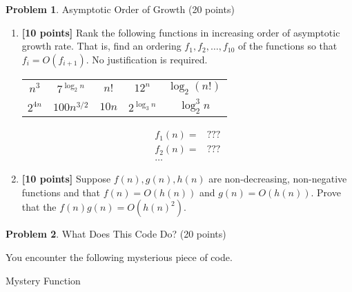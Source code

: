 \documentclass[11pt]{article}
\theoremstyle{definition}
\theoremstyle{theorem}
\newtheorem{prob}{Problem}
\newcommand{\solution}{\medskip\noindent{\color{DarkBlue}\textbf{Solution:}}}
\begin{document}
\newpage
\begin{prob} Asymptotic Order of Growth (20 points) \end{prob}
\begin{enumerate}[label=(\alph*)]
\item  \textbf{[10 points]} Rank the following functions in increasing order of asymptotic growth rate.  That is, find an ordering $f_1, f_2, \ldots, f_{10}$ of the functions so that $f_i = O(f_{i+1})$. No justification is required.

\begin{center}
\begin{tabular}{ccccc}
$n^3$ & $7^{\log_2 n}$ & $n!$ & $12^n$ & $\log_2 (n!)$  \\
$2^{4n}$ & $100 n^{3/2}$ & $10n$ & $2^{\log_3 n}$ & $\log_2^3 n$
\end{tabular}
\end{center}

\solution

\vspace{-20pt}
\begin{align*}
    f_1(n) ={} &??? \\
    f_2(n) ={} &??? \\
    \dots &
\end{align*}

\item  \textbf{[10 points]} Suppose $f(n), g(n), h(n)$ are non-decreasing, non-negative functions and that $f(n) = O(h(n))$ and $g(n) = O(h(n))$.  Prove that the $f(n)g(n) = O(h(n)^2)$.

\solution

\end{enumerate}

\newpage
\begin{prob} What Does This Code Do? (20 points)\end{prob}

You encounter the following mysterious piece of code.

\begin{algorithm}
\caption{Mystery Function}
\end{algorithm}
\end{document}

